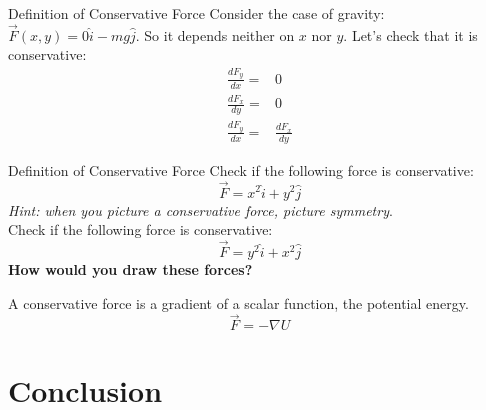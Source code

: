 \documentclass{beamer}
\begin{document}
\begin{frame}{Definition of Conservative Force}
Consider the case of gravity: $\vec{F}(x,y) = 0\hat{i} -mg \hat{j}$.  So it depends neither on $x$ nor $y$.  Let's check that it is conservative:
\begin{align}
\frac{dF_y}{dx} =& 0 \\
\frac{dF_x}{dy} =& 0 \\
\frac{dF_y}{dx} =& \frac{dF_x}{dy}
\end{align}
\end{frame}

\begin{frame}{Definition of Conservative Force}
\small
Check if the following force is conservative:
\begin{equation}
\vec{F} = x^2\hat{i}+y^2\hat{j}
\end{equation}
\textit{Hint: when you picture a conservative force, picture symmetry}. \\ \vspace{0.5cm}
Check if the following force is conservative:
\begin{equation}
\vec{F} = y^2\hat{i}+x^2\hat{j}
\end{equation}
\alert{\textbf{How would you draw these forces?}}
\begin{tcolorbox}[colback=white,colframe=red!40!blue,title=Corollary 2]
A conservative force is a gradient of a scalar function, the potential energy.
\begin{equation}
\vec{F} = - \nabla U
\end{equation}
\end{tcolorbox}
\end{frame}

\section{Conclusion}
\end{document}
